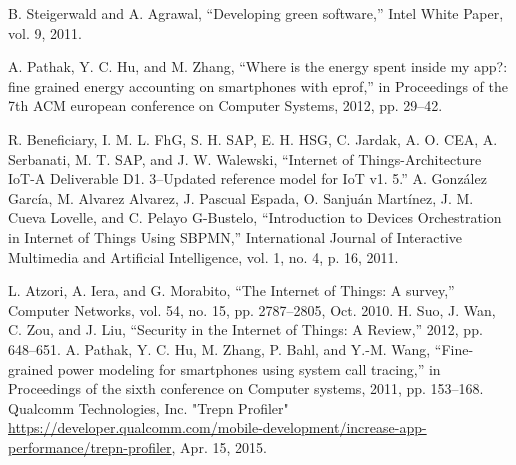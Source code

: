 B. Steigerwald and A. Agrawal, “Developing green software,” Intel White Paper, vol. 9, 2011.

A. Pathak, Y. C. Hu, and M. Zhang, “Where is the energy spent inside my app?: fine grained energy accounting on smartphones with eprof,” in Proceedings of the 7th ACM european conference on Computer Systems, 2012, pp. 29–42.

R. Beneficiary, I. M. L. FhG, S. H. SAP, E. H. HSG, C. Jardak, A. O. CEA, A. Serbanati, M. T. SAP, and J. W. Walewski, “Internet of Things-Architecture IoT-A Deliverable D1. 3–Updated reference model for IoT v1. 5.”
A. González García, M. Alvarez Alvarez, J. Pascual Espada, O. Sanjuán Martínez, J. M. Cueva Lovelle, and C. Pelayo G-Bustelo, “Introduction to Devices Orchestration in Internet of Things Using SBPMN,” International Journal of Interactive Multimedia and Artificial Intelligence, vol. 1, no. 4, p. 16, 2011.

L. Atzori, A. Iera, and G. Morabito, “The Internet of Things: A survey,” Computer Networks, vol. 54, no. 15, pp. 2787–2805, Oct. 2010.
H. Suo, J. Wan, C. Zou, and J. Liu, “Security in the Internet of Things: A Review,” 2012, pp. 648–651.
A. Pathak, Y. C. Hu, M. Zhang, P. Bahl, and Y.-M. Wang, “Fine-grained power modeling for smartphones using system call tracing,” in Proceedings of the sixth conference on Computer systems, 2011, pp. 153–168.
Qualcomm Technologies, Inc. "Trepn Profiler" \url{https://developer.qualcomm.com/mobile-development/increase-app-performance/trepn-profiler}, Apr. 15, 2015.
